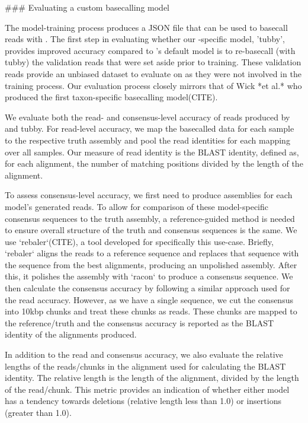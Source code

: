 \begin{markdown}

### Evaluating a custom \ont{} basecalling model

The model-training process produces a JSON file that can be used to basecall \ont{} reads with \guppy{}. The first step in evaluating whether our \mtb{}-specific model, 'tubby', provides improved accuracy compared to \guppy{}'s default model is to re-basecall (with tubby) the validation reads that were set aside prior to training. These validation reads provide an unbiased dataset to evaluate on as they were not involved in the training process. Our evaluation process closely mirrors that of Wick *et al.* who produced the first taxon-specific \ont{} basecalling model(CITE).  

We evaluate both the read- and consensus-level accuracy of reads produced by \guppy{} and tubby. For read-level accuracy, we map the basecalled data for each sample to the respective truth assembly and pool the read identities for each mapping over all samples. Our measure of read identity is the BLAST identity, defined as, for each alignment, the number of matching positions divided by the length of the alignment.  

To assess consensus-level accuracy, we first need to produce assemblies for each model's generated reads. To allow for comparison of these model-specific consensus sequences to the truth assembly, a reference-guided method is needed to ensure overall structure of the truth and consensus sequences is the same. We use `rebaler`(CITE), a tool developed for specifically this use-case. Briefly, `rebaler` aligns the reads to a reference sequence and replaces that sequence with the sequence from the best alignments, producing an unpolished assembly. After this, it polishes the assembly with `racon` to produce a consensus sequence. We then calculate the consensus accuracy by following a similar approach used for the read accuracy. However, as we have a single sequence, we cut the consensus into 10kbp chunks and treat these chunks as reads. These chunks are mapped to the reference/truth and the consensus accuracy is reported as the BLAST identity of the alignments produced.  

In addition to the read and consensus accuracy, we also evaluate the relative lengths of the reads/chunks in the alignment used for calculating the BLAST identity. The relative length is the length of the alignment, divided by the length of the read/chunk. This metric provides an indication of whether either model has a tendency towards deletions (relative length less than 1.0) or insertions (greater than 1.0).  


\end{markdown}
